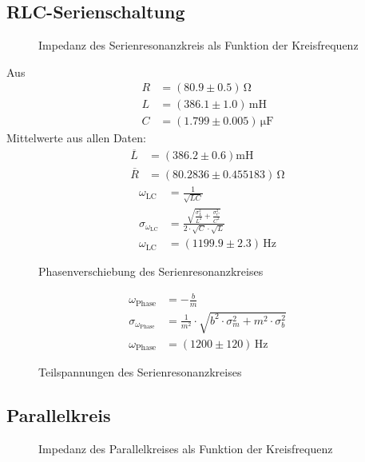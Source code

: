 \documentclass[12pt,a4paper,titlepage,headinclude,bibtotoc]{scrartcl}
\begin{document}
\subsection{RLC-Serienschaltung}
\begin{figure}[!htb]
	\centering
	
	\caption{Impedanz des Serienresonanzkreis als Funktion der Kreisfrequenz}
	\label{fig:messung2}
\end{figure}
Aus
\begin{align}
	R &= (80.9 \pm 0.5)\,\si{\ohm}\\
	L &= (386.1 \pm 1.0)\,\si{\milli\henry}\\
	C &= (1.799 \pm 0.005)\,\si{\micro\farad}
\end{align}
Mittelwerte aus allen Daten:
\begin{align}
\overline L&=(386.2 \pm 0.6)\si{\milli\henry}\\
\overline R&=(80.2836 \pm 0.455183)\,\si{\ohm}
\end{align}
\begin{align}
\omega_\text{LC}&=\frac{1}{\sqrt{LC}}\\
\sigma_{\omega_\text{LC}}&=\frac{\sqrt{\frac{\sigma_{L}^{2}}{L^{2}} + \frac{\sigma_{C}^{2}}{C^{2}}}}{2 \cdot \sqrt{C} \cdot \sqrt{L}}\\
\omega_\text{LC}&=(1199.9 \pm 2.3)\,\si{\hertz}
\end{align}
\begin{figure}[!htb]
	\centering
	
	\caption{Phasenverschiebung des Serienresonanzkreises}
	\label{fig:phase}
\end{figure}

\begin{align}
\omega_\text{Phase}&=- \frac{b}{m}\\
\sigma_{\omega_\text{Phase}}&=\frac{1}{m^{2}} \cdot \sqrt{b^{2} \cdot \sigma_{m}^{2} + m^{2} \cdot \sigma_{b}^{2}}\\
\omega_\text{Phase}&=(1200 \pm 120)\,\si\hertz
\end{align}
\begin{figure}[!htb]
	\centering
	
	\caption{Teilspannungen des Serienresonanzkreises}
	\label{fig:teilU}
\end{figure}

\subsection{Parallelkreis}
\begin{figure}[!htb]
	\centering
	
	\caption{Impedanz des Parallelkreises als Funktion der Kreisfrequenz}
	\label{fig:messung3}
\end{figure}
\end{document}
